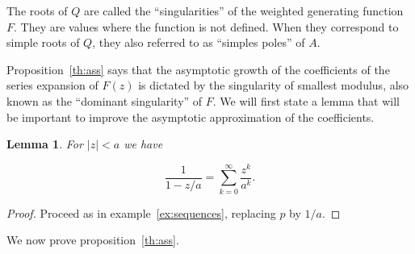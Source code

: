 \documentclass{article}
\newtheorem{lemma}{Lemma}
\begin{document}
The roots of $Q$ are called the ``singularities'' of the weighted
generating function $F$. They are values where the function is not
defined. When they correspond to simple roots of $Q$, they also referred
to as ``simples poles'' of $A$.

Proposition~\ref{th:ass} says that the asymptotic growth of the
coefficients of the series expansion of $F(z)$ is dictated by the
singularity of smallest modulus, also known as the ``dominant
singularity'' of $F$. We will first state a lemma that will be
important to improve the asymptotic approximation of the coefficients.

\begin{lemma}
\label{lemma:poles}
For $|z| < a$ we have

\begin{equation}
\label{eq:poles}
\frac{1}{1-z/a} = \sum_{k=0}^\infty \frac{z^k}{a^k}.
\end{equation}
\end{lemma}

\begin{proof}
Proceed as in example~\ref{ex:sequences}, replacing $p$ by $1/a$.
\end{proof}

We now prove proposition~\ref{th:ass}.
\end{document}
